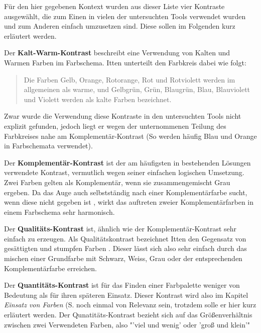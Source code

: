 Für den hier gegebenen Kontext wurden aus dieser Liste vier Kontraste ausgewählt, die zum Einen in vielen der untersuchten Tools verwendet wurden und zum Anderen einfach umzusetzen sind. Diese sollen im Folgenden kurz erläutert werden.

Der \textbf{Kalt-Warm-Kontrast} beschreibt eine Verwendung von Kalten und Warmen Farben im Farbschema. Itten unterteilt den Farbkreis dabei wie folgt:

\begin{quote}
Die Farben Gelb, Orange, Rotorange, Rot und Rotviolett werden im allgemeinen als warme, und Gelbgrün, Grün, Blaugrün, Blau, Blauviolett und Violett werden als kalte Farben bezeichnet.
\cite[S. 45]{Itten201006}
\end{quote}

Zwar wurde die Verwendung diese Kontraste in den untersuchten Tools nicht explizit gefunden, jedoch liegt er wegen der unternommenen Teilung des Farbkreises nahe am Komplementär-Kontrast (So werden häufig Blau und Orange in Farbschemata verwendet).

Der \textbf{Komplementär-Kontrast} ist der am häufigsten in bestehenden Lösungen verwendete Kontrast, vermutlich wegen seiner einfachen logischen Umsetzung. Zwei Farben gelten als Komplementär, wenn sie zusammengemischt Grau ergeben.
Da das Auge auch selbstständig nach einer Komplementärfarbe sucht, wenn diese nicht gegeben ist \cite[S. 49]{Itten201006}, wirkt das auftreten zweier Komplementärfarben in einem Farbschema sehr harmonisch.

Der \textbf{Qualitäts-Kontrast} ist, ähnlich wie der Komplementär-Kontrast sehr einfach zu erzeugen. Als Qualitätskontrast bezeichnet Itten den Gegensatz von gesättigten und stumpfen Farben \cite[S. 55]{Itten201006}. Dieser lässt sich also sehr einfach durch das mischen einer Grundfarbe mit Schwarz, Weiss, Grau oder der entsprechenden Komplementärfarbe erreichen.

Der \textbf{Quantitäts-Kontrast} ist für das Finden einer Farbpalette weniger von Bedeutung als für ihren späteren Einsatz. Dieser Kontrast wird also im Kapitel \textit{Einsatz von Farben} (S. \pageref{einsatz} noch einmal von Relevanz sein, trotzdem solle er hier kurz erläutert werden. Der Qunatitäts-Kontrast bezieht sich auf das Größenverhältnis zwischen zwei Verwendeten Farben, also "'viel und wenig' oder 'groß und klein'" \cite[S. 59]{Itten201006}


